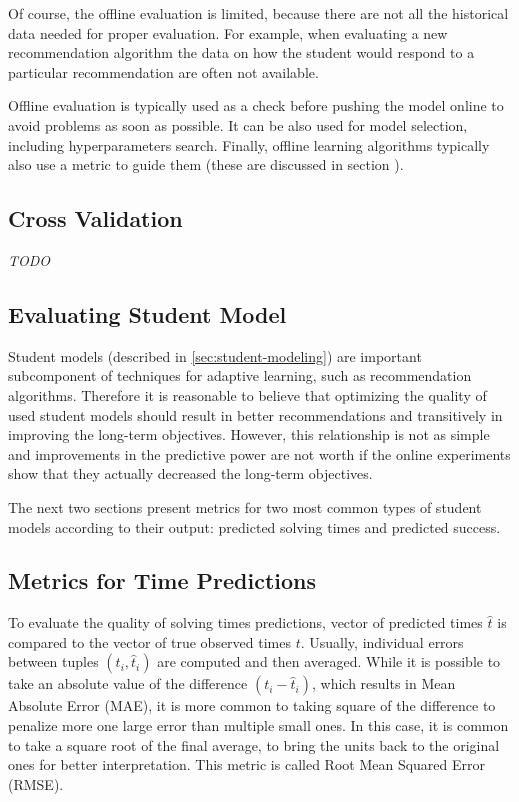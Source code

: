 Of course, the offline evaluation is limited,
  because there are not all the historical data needed
  for proper evaluation.
For example, when evaluating a new recommendation algorithm
  the data on how the student would respond to a particular recommendation
  are often not available.

Offline evaluation is typically used as a check before pushing
  the model online to avoid problems as soon as possible.
It can be also used for model selection,
  including hyperparameters search.
Finally, offline learning algorithms typically also use
  a metric to guide them
  (these are discussed in section \label{sec:metrics-to-guide-learning}).

\subsection{Cross Validation}

\emph{TODO}


\subsection{Evaluating Student Model}

Student models (described in \ref{sec:student-modeling})
  are important subcomponent of techniques for adaptive learning,
  such as recommendation algorithms.
Therefore it is reasonable to believe that optimizing the quality
  of used student models should result in better recommendations
  and transitively in improving the long-term objectives.
However, this relationship is not as simple
  and improvements in the predictive power are not worth
  if the online experiments show that they actually
  decreased the long-term objectives.

The next two sections present metrics for two most common
  types of student models according to their output:
  predicted solving times and predicted success.

\subsection{Metrics for Time Predictions}
\label{sec:metrics-for-time-predictions}

To evaluate the quality of solving times predictions,
  vector of predicted times $\hat{t}$ is compared to
  the vector of true observed times $t$.
Usually, individual errors between tuples $(t_i, \hat{t}_i)$ are computed
  and then averaged.
While it is possible to take an absolute value of the
  difference $(t_i - \hat{t}_i)$,
  which results in Mean Absolute Error (MAE),
it is more common to taking square of the difference
  to penalize more one large error than multiple small ones.
In this case, it is common to take a square root of the final
  average, to bring the units back to the original ones
  for better interpretation.
This metric is called Root Mean Squared Error (RMSE).

